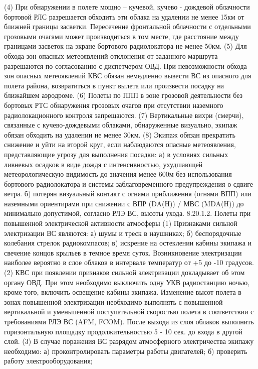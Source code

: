 (4) При обнаружении в полете мощно – кучевой, кучево - дождевой облачности бортовой РЛС разрешается обходить эти облака на удалении не менее 15км от ближней границы засветки. Пересечение фронтальной облачности с отдельными грозовыми очагами может производиться в том месте, где расстояние между границами засветок на экране бортового радиолокатора не менее 50км.
(5) Для обхода зон опасных метеоявлений отклонения от заданного маршрута разрешаются по согласованию с диспетчером ОВД. При невозможности обхода зон опасных метеоявлений КВС обязан немедленно вывести ВС из опасного для полета района, возвратиться в пункт вылета или произвести посадку на ближайшем аэродроме.
(6) Полеты по ППП в зоне грозовой деятельности без бортовых РТС обнаружения грозовых очагов при отсутствии наземного радиолокационного контроля запрещаются.
(7) Вертикальные вихри (смерчи), связанные с кучево-дождевыми облаками, обнаруженные визуально, экипаж обязан обходить на удалении не менее 30км.
(8) Экипаж обязан прекратить снижение и уйти на второй круг, если наблюдаются опасные метеоявления, представляющие угрозу для выполнения посадки:
а)	в условиях сильных ливневых осадков в виде дождя с интенсивностью, ухудшающей метеорологическую видимость до значения менее 600м без использования бортового радиолокатора и системы заблаговременного предупреждения о сдвиге ветра.
б)	потерян визуальный контакт с огнями приближения (огнями ВПП) или наземными ориентирами при снижении с ВПР (DA(H)) / МВС (MDA(H)) до минимально допустимой, согласно РЛЭ ВС, высоты ухода.
8.20.1.2.	Полеты при повышенной электрической активности атмосферы
(1) Признаками сильной электризации ВС являются:
а)	шумы и треск в наушниках;
б)	беспорядочные колебания стрелок радиокомпасов;
в)	искрение на остеклении кабины экипажа и свечение концов крыльев в темное время суток.
Возникновение электризации наиболее вероятно в слое облаков в интервале температур от +5 до -10 градусов.
(2) КВС при появлении признаков сильной электризации докладывает об этом органу ОВД. При этом необходимо выключить одну УКВ радиостанцию ночью, кроме того, включить освещение кабины экипажа.
Изменение высот полета в зонах повышенной электризации необходимо выполнять с повышенной вертикальной и уменьшенной поступательной скоростью полета в соответствии с требованиями РЛЭ ВС (AFM, FCOM).
После выхода из слоя облаков выполнить горизонтальную площадку продолжительностью 5 - 10 сек. до входа в другой слой.
(3) В случае поражения ВС разрядом атмосферного электричества экипажу необходимо:
а)	проконтролировать параметры работы двигателей;
б)	проверить работу электрооборудования;
